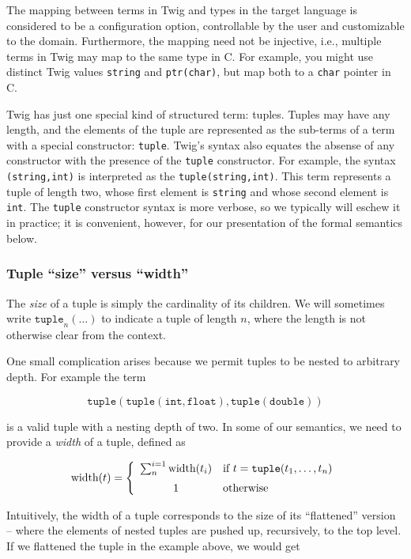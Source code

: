 The mapping between terms in Twig and types in the target language is considered to be a configuration option, controllable by the user and customizable to the domain. Furthermore, the mapping need not be injective, i.e., multiple terms in Twig may map to the same type in C. For example, you might use distinct Twig values \texttt{string} and \texttt{ptr(char)}, but map both to a \texttt{char} pointer in C.

Twig has just one special kind of structured term: tuples. Tuples may have any length, and the elements of the tuple are represented as the sub-terms of a term with a special constructor: \texttt{tuple}. Twig's syntax also equates the absense of any constructor with the presence of the \texttt{tuple} constructor. For example, the syntax \texttt{(string,int)} is interpreted as the \texttt{tuple(string,int)}. This term represents a tuple of length two, whose first element is \texttt{string} and whose second element is \texttt{int}. The \texttt{tuple} constructor syntax is more verbose, so we typically will eschew it in practice; it is convenient, however, for our presentation of the formal semantics below.

\subsubsection{Tuple ``size'' versus ``width''}

The \emph{size} of a tuple is simply the cardinality of its children. We will sometimes write $\mathtt{tuple}_n(\ldots)$ to indicate a tuple of length $n$, where the length is not otherwise clear from the context.

One small complication arises because we permit tuples to be nested to arbitrary depth. For example the term

\[
\mathtt{tuple(tuple(int,float),tuple(double))} 
\]

is a valid tuple with a nesting depth of two. In some of our semantics, we need to provide a \emph{width} of a tuple, defined as 

\[
\mbox{width}(t) = \left\{
  \begin{array}{cl}
    \sum^{i=1}_{n} \mbox{width}(t_i) 
      & \mbox{if } t = \mathtt{tuple}(t_1,\ldots,t_n)\vspace{2mm}\\
    1 & \mbox{otherwise}
  \end{array}
\right.
\]

Intuitively, the width of a tuple corresponds to the size of its ``flattened'' version -- where the elements of nested tuples are pushed up, recursively, to the top level. If we flattened the tuple in the example above, we would get

